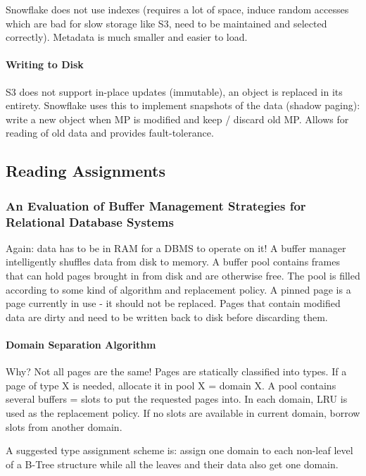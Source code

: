 Snowflake does not use indexes (requires a lot of space, induce random accesses which are bad for slow storage like S3, need to be maintained and selected correctly). Metadata is much smaller and easier to load.

\paragraph{Writing to Disk}
S3 does not support in-place updates (immutable), an object is replaced in its entirety. Snowflake uses this to implement snapshots of the data (shadow paging): write a new object when MP is modified and keep / discard old MP. Allows for reading of old data and provides fault-tolerance.



\subsection{Reading Assignments}

\subsubsection{An Evaluation of Buffer Management Strategies for Relational Database Systems}

Again: data has to be in RAM for a DBMS to operate on it! A buffer manager intelligently shuffles data from disk to memory. A buffer pool contains frames that can hold pages brought in from disk and are otherwise free. The pool is filled according to some kind of algorithm and replacement policy. A pinned page is a page currently in use - it should not be replaced. Pages that contain modified data are dirty and need to be written back to disk before discarding them.

\paragraph{Domain Separation Algorithm}
Why? Not all pages are the same! Pages are statically classified into types. If a page of type X is needed, allocate it in pool X = domain X. A pool contains several buffers = slots to put the requested pages into. In each domain, LRU is used as the replacement policy. If no slots are available in current domain, borrow slots from another domain.

A suggested type assignment scheme is: assign one domain to each non-leaf level of a B-Tree structure while all the leaves and their data also get one domain.

